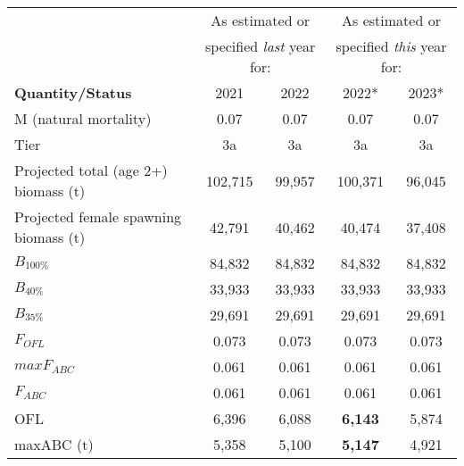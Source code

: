 \documentclass[
  11pt,
]{article}
\begin{document}
\begin{center}
\begin{tabular}{ |lcccc|}
\hline
 & \multicolumn{2}{c}{\cellcolor[gray]{0.9} As estimated or} & 
    \multicolumn{2}{c|}{As estimated or}\\
 & \multicolumn{2}{c}{\cellcolor[gray]{0.9} specified \emph{last} year for:} & 
    \multicolumn{2}{c|}{specified \emph{this} year for:}\\
    
 \textbf{Quantity/Status}                 & \cellcolor[gray]{0.9} 2021    & \cellcolor[gray]{0.9} 2022   & 2022* & 2023*\\ 
 \hline
    M (natural mortality)                 & \cellcolor[gray]{0.9} 0.07    &\cellcolor[gray]{0.9} 0.07    &  0.07  & 0.07\\
    Tier                                  & \cellcolor[gray]{0.9} 3a      & \cellcolor[gray]{0.9} 3a     & 3a & 3a\\
    Projected total (age 2+) biomass (t)  & \cellcolor[gray]{0.9} 102,715 & \cellcolor[gray]{0.9} 99,957 & 100,371 &    96,045 \\
    Projected female spawning biomass (t) & \cellcolor[gray]{0.9} 42,791  & \cellcolor[gray]{0.9} 40,462 & 40,474 & 37,408 \\
    $B_{100\%}$                           & \cellcolor[gray]{0.9} 84,832  & \cellcolor[gray]{0.9} 84,832 & 84,832   & 84,832 \\
    $B_{40\%}$                            & \cellcolor[gray]{0.9} 33,933  & \cellcolor[gray]{0.9} 33,933 & 33,933 & 33,933 \\
    $B_{35\%}$                            & \cellcolor[gray]{0.9} 29,691  & \cellcolor[gray]{0.9} 29,691 & 29,691    & 29,691 \\
  $F_{OFL}$                               & \cellcolor[gray]{0.9} 0.073   & \cellcolor[gray]{0.9} 0.073  & 0.073 & 0.073\\
   $maxF_{ABC}$                           & \cellcolor[gray]{0.9} 0.061   & \cellcolor[gray]{0.9} 0.061  & 0.061 & 0.061\\
   $F_{ABC}$                              & \cellcolor[gray]{0.9} 0.061   & \cellcolor[gray]{0.9} 0.061  & 0.061 & 0.061\\
    OFL                                   & \cellcolor[gray]{0.9} 6,396   & \cellcolor[gray]{0.9} 6,088  & \bf{6,143} & 5,874 \\
    maxABC (t)                            & \cellcolor[gray]{0.9} 5,358   & \cellcolor[gray]{0.9} 5,100  & \bf{5,147} & 4,921 \\

\end{tabular}
\end{center}
\end{document}
